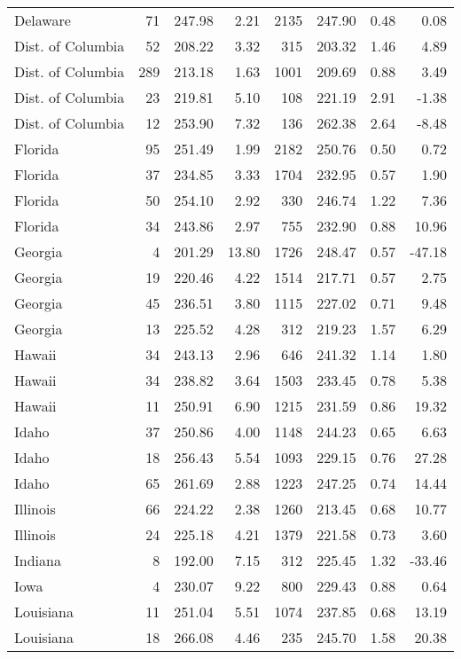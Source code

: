 \begin{longtable}{lrrr@{\extracolsep{10pt}}rrrr}
  Delaware &  71 & 247.98 & 2.21 & 2135 & 247.90 & 0.48 & 0.08 \\ 
  Dist. of Columbia &  52 & 208.22 & 3.32 & 315 & 203.32 & 1.46 & 4.89 \\ 
  Dist. of Columbia & 289 & 213.18 & 1.63 & 1001 & 209.69 & 0.88 & 3.49 \\ 
  Dist. of Columbia &  23 & 219.81 & 5.10 & 108 & 221.19 & 2.91 & -1.38 \\ 
  Dist. of Columbia &  12 & 253.90 & 7.32 & 136 & 262.38 & 2.64 & -8.48 \\ 
  Florida &  95 & 251.49 & 1.99 & 2182 & 250.76 & 0.50 & 0.72 \\ 
  Florida &  37 & 234.85 & 3.33 & 1704 & 232.95 & 0.57 & 1.90 \\ 
  Florida &  50 & 254.10 & 2.92 & 330 & 246.74 & 1.22 & 7.36 \\ 
  Florida &  34 & 243.86 & 2.97 & 755 & 232.90 & 0.88 & 10.96 \\ 
  Georgia &   4 & 201.29 & 13.80 & 1726 & 248.47 & 0.57 & -47.18 \\ 
  Georgia &  19 & 220.46 & 4.22 & 1514 & 217.71 & 0.57 & 2.75 \\ 
  Georgia &  45 & 236.51 & 3.80 & 1115 & 227.02 & 0.71 & 9.48 \\ 
  Georgia &  13 & 225.52 & 4.28 & 312 & 219.23 & 1.57 & 6.29 \\ 
  Hawaii &  34 & 243.13 & 2.96 & 646 & 241.32 & 1.14 & 1.80 \\ 
  Hawaii &  34 & 238.82 & 3.64 & 1503 & 233.45 & 0.78 & 5.38 \\ 
  Hawaii &  11 & 250.91 & 6.90 & 1215 & 231.59 & 0.86 & 19.32 \\ 
  Idaho &  37 & 250.86 & 4.00 & 1148 & 244.23 & 0.65 & 6.63 \\ 
  Idaho &  18 & 256.43 & 5.54 & 1093 & 229.15 & 0.76 & 27.28 \\ 
  Idaho &  65 & 261.69 & 2.88 & 1223 & 247.25 & 0.74 & 14.44 \\ 
  Illinois &  66 & 224.22 & 2.38 & 1260 & 213.45 & 0.68 & 10.77 \\ 
  Illinois &  24 & 225.18 & 4.21 & 1379 & 221.58 & 0.73 & 3.60 \\ 
  Indiana &   8 & 192.00 & 7.15 & 312 & 225.45 & 1.32 & -33.46 \\ 
  Iowa &   4 & 230.07 & 9.22 & 800 & 229.43 & 0.88 & 0.64 \\ 
  Louisiana &  11 & 251.04 & 5.51 & 1074 & 237.85 & 0.68 & 13.19 \\ 
  Louisiana &  18 & 266.08 & 4.46 & 235 & 245.70 & 1.58 & 20.38 \\ 

\end{longtable}
